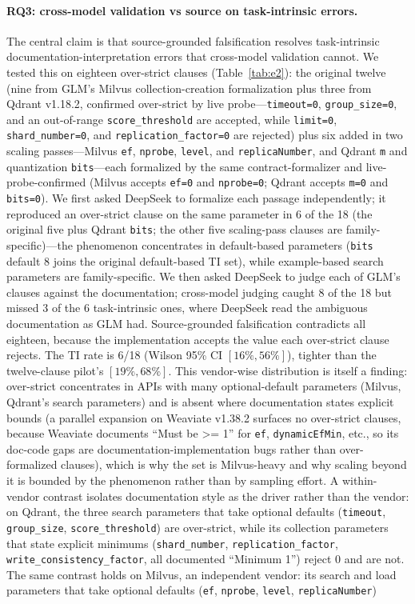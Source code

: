 \documentclass[sigconf]{acmart}
\begin{document}
\paragraph{RQ3: cross-model validation vs source on task-intrinsic errors.}
The central claim is that source-grounded falsification resolves task-intrinsic documentation-interpretation errors that cross-model validation cannot. We tested this on eighteen over-strict clauses (Table~\ref{tab:e2}): the original twelve (nine from GLM's Milvus collection-creation formalization plus three from Qdrant v1.18.2, confirmed over-strict by live probe---\texttt{timeout=0}, \texttt{group\_size=0}, and an out-of-range \texttt{score\_threshold} are accepted, while \texttt{limit=0}, \texttt{shard\_number=0}, and \texttt{replication\_factor=0} are rejected) plus six added in two scaling passes---Milvus \texttt{ef}, \texttt{nprobe}, \texttt{level}, and \texttt{replicaNumber}, and Qdrant \texttt{m} and quantization \texttt{bits}---each formalized by the same contract-formalizer and live-probe-confirmed (Milvus accepts \texttt{ef=0} and \texttt{nprobe=0}; Qdrant accepts \texttt{m=0} and \texttt{bits=0}). We first asked DeepSeek to formalize each passage independently; it reproduced an over-strict clause on the same parameter in 6 of the 18 (the original five plus Qdrant \texttt{bits}; the other five scaling-pass clauses are family-specific)---the phenomenon concentrates in default-based parameters (\texttt{bits} default 8 joins the original default-based TI set), while example-based search parameters are family-specific. We then asked DeepSeek to judge each of GLM's clauses against the documentation; cross-model judging caught 8 of the 18 but missed 3 of the 6 task-intrinsic ones, where DeepSeek read the ambiguous documentation as GLM had. Source-grounded falsification contradicts all eighteen, because the implementation accepts the value each over-strict clause rejects. The TI rate is 6/18 (Wilson 95\% CI $[16\%, 56\%]$), tighter than the twelve-clause pilot's $[19\%, 68\%]$. This vendor-wise distribution is itself a finding: over-strict concentrates in APIs with many optional-default parameters (Milvus, Qdrant's search parameters) and is absent where documentation states explicit bounds (a parallel expansion on Weaviate v1.38.2 surfaces no over-strict clauses, because Weaviate documents ``Must be >= 1'' for \texttt{ef}, \texttt{dynamicEfMin}, etc., so its doc-code gaps are documentation-implementation bugs rather than over-formalized clauses), which is why the set is Milvus-heavy and why scaling beyond it is bounded by the phenomenon rather than by sampling effort. A within-vendor contrast isolates documentation style as the driver rather than the vendor: on Qdrant, the three search parameters that take optional defaults (\texttt{timeout}, \texttt{group\_size}, \texttt{score\_threshold}) are over-strict, while its collection parameters that state explicit minimums (\texttt{shard\_number}, \texttt{replication\_factor}, \texttt{write\_consistency\_factor}, all documented ``Minimum 1'') reject 0 and are not. The same contrast holds on Milvus, an independent vendor: its search and load parameters that take optional defaults (\texttt{ef}, \texttt{nprobe}, \texttt{level}, \texttt{replicaNumber}) 
\end{document}
